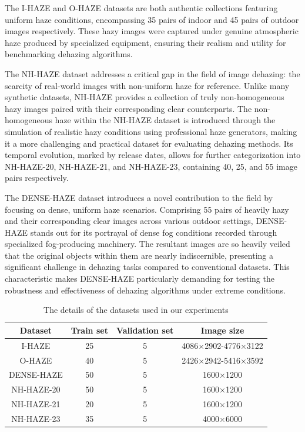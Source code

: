 \documentclass[lettersize,journal]{IEEEtran}
\begin{document}
The I-HAZE and O-HAZE datasets are both authentic collections featuring uniform haze conditions, encompassing 35 pairs of indoor and 45 pairs of outdoor images respectively. These hazy images were captured under genuine atmospheric haze produced by specialized equipment, ensuring their realism and utility for benchmarking dehazing algorithms.

The NH-HAZE dataset addresses a critical gap in the field of image dehazing: the scarcity of real-world images with non-uniform haze for reference. Unlike many synthetic datasets, NH-HAZE provides a collection of truly non-homogeneous hazy images paired with their corresponding clear counterparts. The non-homogeneous haze within the NH-HAZE dataset is introduced through the simulation of realistic hazy conditions using professional haze generators, making it a more challenging and practical dataset for evaluating dehazing methods. Its temporal evolution, marked by release dates, allows for further categorization into NH-HAZE-20, NH-HAZE-21, and NH-HAZE-23, containing 40, 25, and 55 image pairs respectively.

The DENSE-HAZE dataset introduces a novel contribution to the field by focusing on dense, uniform haze scenarios. Comprising 55 pairs of heavily hazy and their corresponding clear images across various outdoor settings, DENSE-HAZE stands out for its portrayal of dense fog conditions recorded through specialized fog-producing machinery. The resultant images are so heavily veiled that the original objects within them are nearly indiscernible, presenting a significant challenge in dehazing tasks compared to conventional datasets. This characteristic makes DENSE-HAZE particularly demanding for testing the robustness and effectiveness of dehazing algorithms under extreme conditions.

\begin{table}
	\begin{center}
		\caption{The details of the datasets used in our experiments}
		\label{table_dataset}
		\begin{tabular}{ c | c | c | c }
			\hline
			Dataset & Train set & Validation set & Image size \\
			\hline
			I-HAZE & 25 & 5 & 4086×2902-4776×3122 \\
			O-HAZE & 40 & 5 & 2426×2942-5416×3592 \\
			DENSE-HAZE & 50 & 5 & 1600×1200 \\
			NH-HAZE-20 & 50 & 5 & 1600×1200 \\
			NH-HAZE-21 & 20 & 5 & 1600×1200 \\
			NH-HAZE-23 & 35 & 5 & 4000×6000 \\
			\hline			
		\end{tabular}
	\end{center}
\end{table}
\end{document}
